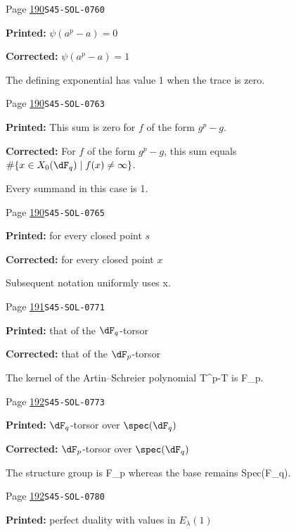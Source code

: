 \begin{description}
\smallskip
\item[\hypertarget{apparatus:EN-0115}{115}] Page \hyperlink{printpage:en:190}{190}\quad\texttt{S45-SOL-0760}
\par\noindent\textbf{Printed:} \(\psi(a^p-a)=0\)
\par\noindent\textbf{Corrected:} \(\psi(a^p-a)=1\)
\par\noindent The defining exponential has value 1 when the trace is zero.
\smallskip
\item[\hypertarget{apparatus:EN-0116}{116}] Page \hyperlink{printpage:en:190}{190}\quad\texttt{S45-SOL-0763}
\par\noindent\textbf{Printed:} This sum is zero for $f$ of the form $g^p-g$.
\par\noindent\textbf{Corrected:} For $f$ of the form $g^p-g$, this sum equals $\#\{x\in X_0(\dF_q)\mid f(x)\ne\infty\}$.
\par\noindent Every summand in this case is 1.
\smallskip
\item[\hypertarget{apparatus:EN-0117}{117}] Page \hyperlink{printpage:en:190}{190}\quad\texttt{S45-SOL-0765}
\par\noindent\textbf{Printed:} for every closed point $s$
\par\noindent\textbf{Corrected:} for every closed point $x$
\par\noindent Subsequent notation uniformly uses x.
\smallskip
\item[\hypertarget{apparatus:EN-0118}{118}] Page \hyperlink{printpage:en:191}{191}\quad\texttt{S45-SOL-0771}
\par\noindent\textbf{Printed:} that of the $\dF_q$-torsor
\par\noindent\textbf{Corrected:} that of the $\dF_p$-torsor
\par\noindent The kernel of the Artin–Schreier polynomial T\textasciicircum{}p-T is F\_p.
\smallskip
\item[\hypertarget{apparatus:EN-0119}{119}] Page \hyperlink{printpage:en:192}{192}\quad\texttt{S45-SOL-0773}
\par\noindent\textbf{Printed:} $\dF_q$-torsor over $\spec(\dF_q)$
\par\noindent\textbf{Corrected:} $\dF_p$-torsor over $\spec(\dF_q)$
\par\noindent The structure group is F\_p whereas the base remains Spec(F\_q).
\smallskip
\item[\hypertarget{apparatus:EN-0120}{120}] Page \hyperlink{printpage:en:192}{192}\quad\texttt{S45-SOL-0780}
\par\noindent\textbf{Printed:} perfect duality with values in $E_\lambda(1)$

\end{description}
